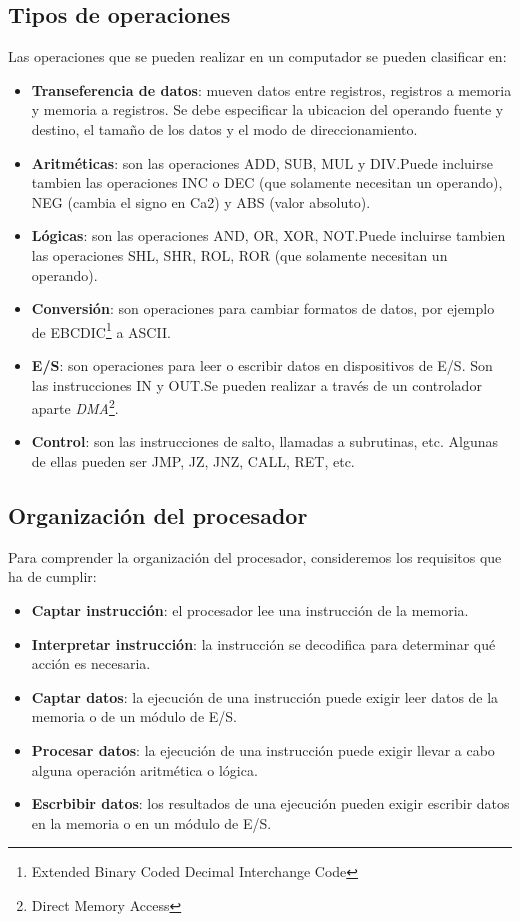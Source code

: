 \subsection{Tipos de operaciones}

Las operaciones que se pueden realizar en un computador se pueden clasificar en:

\begin{itemize}
  \item \textbf{Transeferencia de datos}: mueven datos entre registros, registros a memoria y memoria a registros. Se debe especificar la ubicacion del operando fuente y destino, el tamaño de los datos y el modo de direccionamiento.
  \item \textbf{Aritméticas}: son las operaciones ADD, SUB, MUL y DIV.\@ Puede incluirse tambien las operaciones INC o DEC (que solamente necesitan un operando), NEG (cambia el signo en Ca2) y ABS (valor absoluto).
  \item \textbf{Lógicas}: son las operaciones AND, OR, XOR, NOT.\@ Puede incluirse tambien las operaciones SHL, SHR, ROL, ROR (que solamente necesitan un operando).
  \item \textbf{Conversión}: son operaciones para cambiar formatos de datos, por ejemplo de EBCDIC\footnote{Extended Binary Coded Decimal Interchange Code} a ASCII.\@
  \item \textbf{E/S}: son operaciones para leer o escribir datos en dispositivos de E/S. Son las instrucciones IN y OUT.\@ Se pueden realizar a través de un controlador aparte \textit{DMA}\footnote{Direct Memory Access}.
  \item \textbf{Control}: son las instrucciones de salto, llamadas a subrutinas, etc. Algunas de ellas pueden ser JMP, JZ, JNZ, CALL, RET, etc.
\end{itemize}

\subsection{Organización del procesador}

Para comprender la organización del procesador, consideremos los requisitos que ha de cumplir:

\begin{itemize}
  \item \textbf{Captar instrucción}: el procesador lee una instrucción de la memoria.
  \item \textbf{Interpretar instrucción}: la instrucción se decodifica para determinar qué acción es necesaria.
  \item \textbf{Captar datos}: la ejecución de una instrucción puede exigir leer datos de la memoria o de un módulo de E/S.
  \item \textbf{Procesar datos}: la ejecución de una instrucción puede exigir llevar a cabo alguna operación aritmética o lógica.
  \item \textbf{Escrbibir datos}: los resultados de una ejecución pueden exigir escribir datos en la memoria o en un módulo de E/S.
\end{itemize}

